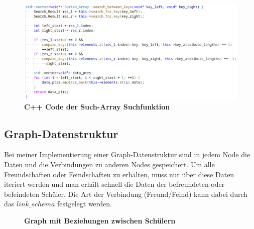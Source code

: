 \documentclass[11pt,a4paper]{article}
\begin{document}

\begin{figure}[H]
    \centering
    \includegraphics[width=1.1\textwidth]{./res/code_sort_array.png}
    \caption{\textbf{C++ Code der Such-Array Suchfunktion}}
\end{figure}

\subsection{Graph-Datenstruktur}

Bei meiner Implementierung einer Graph-Datenstruktur sind in jedem Node
die Daten und die Verbindungen zu anderen Nodes gespeichert.
Um alle Freundschaften oder Feindschaften zu erhalten, muss nur über diese
Daten iteriert werden und man erhält schnell die Daten der befreundeten oder
befeindeten Schüler. Die Art der Verbindung (Freund/Feind) kann dabei durch
das $link\_schema$ festgelegt werden.

\begin{figure}[H]
    \centering
    \caption{\textbf{Graph mit Beziehungen zwischen Schülern}}
\end{figure}
\end{document}

